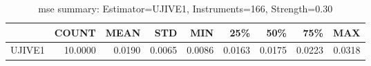\begin{table}[ht]
\centering
\caption{mse summary: Estimator=UJIVE1, Instruments=166, Strength=0.30}
\begin{tabular}{lrrrrrrrr}
\toprule
 & COUNT & MEAN & STD & MIN & 25\% & 50\% & 75\% & MAX \\
\midrule
UJIVE1 & 10.0000 & 0.0190 & 0.0065 & 0.0086 & 0.0163 & 0.0175 & 0.0223 & 0.0318 \\
\bottomrule
\end{tabular}
\end{table}
